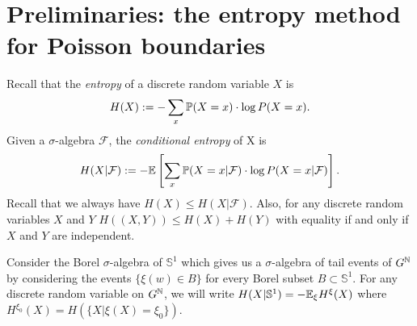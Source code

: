 
\section{Preliminaries: the entropy method for Poisson boundaries}
Recall that the \emph{entropy} of a discrete random variable $X$ is
$$H(X) := -\sum_x \P(X=x) \cdot \log P(X=x).$$
Given a $\sigma$-algebra $\mathcal{F}$, the \emph{conditional entropy} of X is
$$H(X|\mathcal{F}) := - \E \left[\sum_x \P(X=x|\mathcal{F}) \cdot \log P(X=x|\mathcal{F})\right].$$
Recall that we always have $H(X) \leq H(X|\mathcal{F})$.
Also, for any discrete random variables $X$ and $Y$ $H((X,Y)) \leq H(X) + H(Y)$ with equality if and only if $X$ and $Y$ are independent.

Consider the Borel $\sigma$-algebra of $\mathbb{S}^1$ which gives us a $\sigma$-algebra of tail events of $G^\N$ by considering the events $\{\xi(w) \in B\}$ for every Borel subset $B \subset \mathbb{S}^1$.
For any discrete random variable on $G^\N$, we will write 
$H(X|\mathbb{S}^1) = - \E_\xi H^{\xi}(X)$
where $H^{\xi_0}(X) = H(\{X|\xi(X)=\xi_0\})$.

